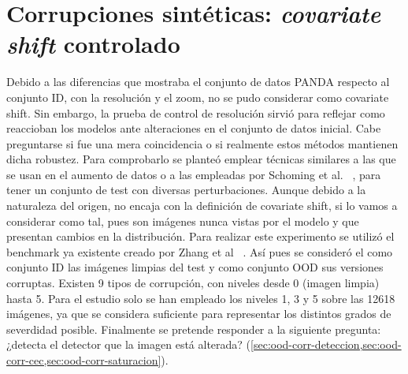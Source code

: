 \section{Corrupciones sintéticas: \emph{covariate shift} controlado}\label{sec:ood-corrupciones}

Debido a las diferencias que mostraba el conjunto de datos PANDA respecto al conjunto ID, con la resolución y el zoom, no se pudo considerar como covariate shift. Sin embargo,
la prueba de control de resolución sirvió para reflejar como reaccioban los modelos ante alteraciones en el conjunto de datos inicial. Cabe preguntarse si fue una mera coincidencia o 
si realmente estos métodos mantienen dicha robustez. Para comprobarlo se planteó emplear técnicas similares a las que se usan en el aumento de datos o a las empleadas por Schoming et al.  ~\cite{schomig2021}, para tener un conjunto de test con diversas perturbaciones.
Aunque debido a la naturaleza del origen, no encaja con la definición de covariate shift, si lo vamos a considerar como tal, pues son imágenes nunca vistas por el modelo y que presentan cambios en la distribución.
Para realizar este experimento se utilizó el benchmark ya existente creado por Zhang et al ~\cite{zhang2022corruptions}. Así pues se consideró el 
como conjunto ID las imágenes limpias del test y como conjunto OOD sus versiones corruptas. Existen 9 tipos de corrupción, con niveles desde 0 (imagen limpia) hasta 5. Para el estudio solo se han empleado 
los niveles 1, 3 y 5 sobre las 12618 imágenes, ya que se considera suficiente para representar los distintos grados de severdidad posible.  Finalmente se pretende responder a la siguiente pregunta: ¿detecta el detector que la imagen está alterada? (\cref{sec:ood-corr-deteccion,sec:ood-corr-cec,sec:ood-corr-saturacion}).

